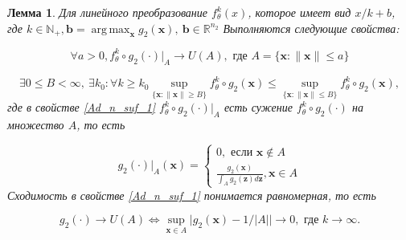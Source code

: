 \documentclass[12pt]{extarticle}
\newtheorem{lemma}[theorem]{Лемма}
\DeclareMathOperator*{\argmax}{arg\,max}
\newcommand{\bfx}{\mathbf{x}}
\newcommand{\bfz}{\mathbf{z}}
\newcommand{\bfb}{\mathbf{b}}
\newcommand{\bbr}{\mathbb{R}}
\begin{document}
\begin{lemma}
\label{lem:Aduenko_not_sufficient} 
Для линейного преобразование $f^k_{\theta}(x)$, которое имеет вид $x/k + b$, где $k\in \mathbb{N}_{+}, \bfb = \argmax_\bfx g_2(\bfx), \ \bfb \in \bbr^{n_2}$ Выполняются следующие свойства:

\begin{equation}
    \label{Ad_n_suf_1}
    \forall a > 0, f^k_\theta\circ g_2(\cdot) |_A \to U(A), \text{ где } A = \{\bfx : \|\bfx\| \leq a\}
\end{equation}

\begin{equation}
    \label{Ad_n_suf_2}
    \exists 0 \leq B < \infty, \ \exists k_0 : \forall k \geq k_0 \sup_{\{\bfx: \|\bfx\|\geq B\}} f^k_\theta\circ g_2(\bfx) \leq \sup_{\{\bfx: \|\bfx\| \leq B\}} f^k_\theta\circ g_2(\bfx),
\end{equation}
где в свойстве \eqref{Ad_n_suf_1} $f^k_\theta\circ g_2(\cdot) |_A$ есть сужение $f^k_\theta\circ g_2(\cdot)$ на множество $A$, то есть 

$$ g_2(\cdot) |_A (\bfx) = \begin{cases} 0, \text{ если } \bfx \not\in A \\ \frac{g_2(\bfx)}{\int_A g_2(\bfz) d\bfz}, \bfx \in A \end{cases} $$
Сходимость в свойстве \eqref{Ad_n_suf_1} понимается равномерная, то есть 

$$g_2(\cdot) \to U(A) \Leftrightarrow \sup_{\bfx \in A} \Big|g_2(\bfx) - 1/|A|\Big| \to 0, \text{ где } k \to \infty. $$
\end{lemma}
\end{document}
